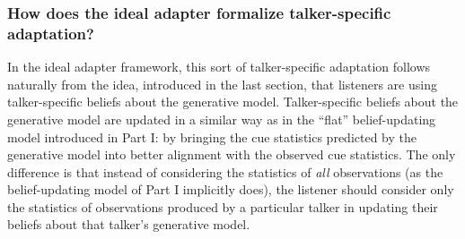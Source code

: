 \subsubsection{How does the ideal adapter formalize talker-specific adaptation?}
\label{sec:how-does-ideal-form-talker-adapt}

In the ideal adapter framework, this sort of talker-specific adaptation follows naturally from the idea, introduced in the last section, that listeners are using talker-specific beliefs about the generative model.  Talker-specific beliefs about the generative model are updated in a similar way as in the ``flat'' belief-updating model introduced in Part I: by bringing the cue statistics predicted by the generative model into better alignment with the observed cue statistics.  The only difference is that instead of considering the statistics of \emph{all} observations (as the belief-updating model of Part I implicitly does), the listener should consider only the statistics of observations produced by a particular talker in updating their beliefs about that talker's generative model.

